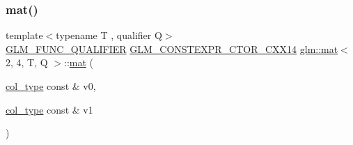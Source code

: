 \mbox{\label{structglm_1_1mat_3_012_00_014_00_01_t_00_01_q_01_4_ab03328300b44f29e808acaa936ac55b9}} 
\subsubsection{\texorpdfstring{mat()}{mat()}\hspace{0.1cm}{\footnotesize\ttfamily [6/21]}}
{\footnotesize\ttfamily template$<$typename T , qualifier Q$>$ \\
\hyperlink{setup_8hpp_a33fdea6f91c5f834105f7415e2a64407}{G\+L\+M\+\_\+\+F\+U\+N\+C\+\_\+\+Q\+U\+A\+L\+I\+F\+I\+ER} \hyperlink{setup_8hpp_a0900f9145e68bf6061b6f5e7be3fa751}{G\+L\+M\+\_\+\+C\+O\+N\+S\+T\+E\+X\+P\+R\+\_\+\+C\+T\+O\+R\+\_\+\+C\+X\+X14} \hyperlink{structglm_1_1mat}{glm\+::mat}$<$ 2, 4, T, Q $>$\+::\hyperlink{structglm_1_1mat}{mat} (\begin{DoxyParamCaption}\item[{\hyperlink{structglm_1_1mat_3_012_00_014_00_01_t_00_01_q_01_4_ae14ad10a9d8ce3908ec89ae373a27872}{col\+\_\+type} const \&}]{v0,  }\item[{\hyperlink{structglm_1_1mat_3_012_00_014_00_01_t_00_01_q_01_4_ae14ad10a9d8ce3908ec89ae373a27872}{col\+\_\+type} const \&}]{v1 }\end{DoxyParamCaption})}

\mbox{\label{structglm_1_1mat_3_012_00_014_00_01_t_00_01_q_01_4_a1002bf14f10af4be0f43476891c61fe9}} 
